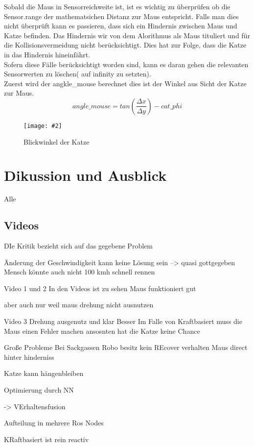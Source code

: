 \documentclass[
a4paper,     %
12pt         %
]{scrartcl}  %
\newcommand{\mygraphics}[3]{
\begin{figure}[!h]
  \begin{center}
    \texttt{[image: \#2]} \\    
    \caption{#3}\label{fig:#2}
  \end{center}
\end{figure}

}
\begin{document}
Sobald die Maus in Sensorreichweite ist, ist es wichtig zu überprüfen ob die Sensor.range der mathematsichen Distanz zur Maus entspricht. Falls man dies nicht überprüft kann es passieren, dass sich ein Hindernis zwischen Maus und Katze befinden. Das Hindernis wir von dem Alorithmus als Maus tituliert und für die Kollisionsvermeidung nicht berücksichtigt. Dies hat zur Folge, dass die Katze in das Hindernis hineinfährt.\\

Sofern diese Fälle berücksichtigt worden sind, kann es daran gehen die relevanten Sensorwerten zu löschen( auf infinity zu setzten). \\

Zuerst wird der angkle\_mouse berechnet dies ist der Winkel aus Sicht der Katze zur Maus.
\[ angle\_mouse=tan( \frac{\Delta x}{\Delta y} ) -cat\_phi \]

\mygraphics{0.7\textwidth}{collisionANGLE2.png}{Blickwinkel der Katze} 



 

\section{Dikussion und Ausblick}
Alle
\subsection{Videos}

DIe Kritik bezieht sich auf das gegebene Problem

Änderung der Geschwindigkeit kann keine Lösung sein --> quasi gottgegeben
Mensch könnte auch nicht 100 kmh schnell rennen

Video 1 und 2
In den Videos ist zu sehen Maus funktioniert gut

aber auch nur weil maus drehung nicht ausnutzen

Video 3
Drehung ausgenutz und klar Besser
Im Falle von Kraftbasiert muss die Maus einen Fehler machen ansosnten hat die Katze keine Chance


Große Probleme Bei Sackgassen
Robo besitz kein REcover verhalten
Maus direct hinter hinderniss

Katze kann hängenbleiben

Optimierung durch NN

-> VErhaltensfusion

Aufteilung in mehrere Ros Nodes

KRaftbasiert ist rein reactiv
\end{document}
